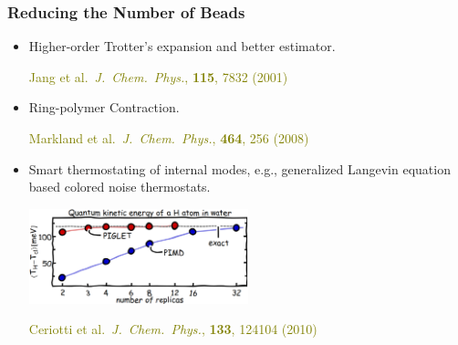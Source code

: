 \begin{frame}
  \frametitle{Reducing the Number of Beads}
  \begin{itemize}
  \item Higher-order Trotter's expansion and better estimator.

    \medskip
    \textcolor{olive}{
      Jang et al.\ \textit{J.\ Chem.\ Phys.}, \textbf{115}, 7832 (2001)
    }
  \item Ring-polymer Contraction.

    \medskip
    \textcolor{olive}{
      Markland et al.\ \textit{J.\ Chem.\ Phys.}, \textbf{464}, 256 (2008)
    }

  \item Smart thermostating of internal modes, e.g., generalized Langevin
equation based colored noise thermostats.

    \begin{center}
    \includegraphics[width=0.5\textwidth]{figs/piglet.pdf}
    \end{center}

    \medskip
    \textcolor{olive}{
      Ceriotti et al.\ \textit{J.\ Chem.\ Phys.}, \textbf{133}, 124104 (2010)
    }
  \end{itemize}
\end{frame}